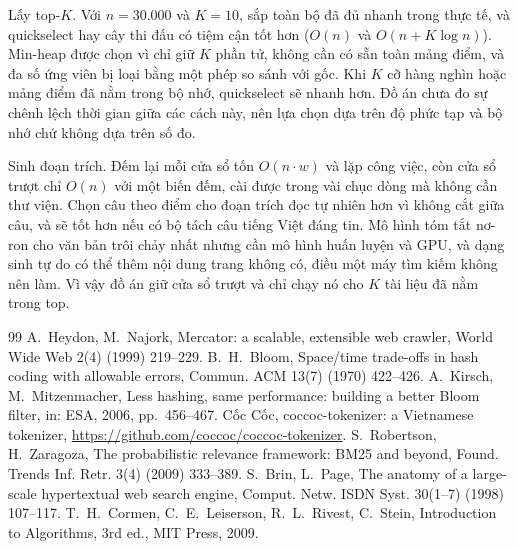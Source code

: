 \documentclass[9pt,twocolumn,a4paper]{extarticle}
\begin{document}
Lấy top-$K$. Với $n=30.000$ và $K=10$, sắp toàn bộ đã đủ nhanh trong thực tế, và quickselect hay cây thi đấu có tiệm cận tốt hơn ($O(n)$ và $O(n+K\log n)$). Min-heap được chọn vì chỉ giữ $K$ phần tử, không cần có sẵn toàn mảng điểm, và đa số ứng viên bị loại bằng một phép so sánh với gốc. Khi $K$ cỡ hàng nghìn hoặc mảng điểm đã nằm trong bộ nhớ, quickselect sẽ nhanh hơn. Đồ án chưa đo sự chênh lệch thời gian giữa các cách này, nên lựa chọn dựa trên độ phức tạp và bộ nhớ chứ không dựa trên số đo.

Sinh đoạn trích. Đếm lại mỗi cửa sổ tốn $O(n\cdot w)$ và lặp công việc, còn cửa sổ trượt chỉ $O(n)$ với một biến đếm, cài được trong vài chục dòng mà không cần thư viện. Chọn câu theo điểm cho đoạn trích đọc tự nhiên hơn vì không cắt giữa câu, và sẽ tốt hơn nếu có bộ tách câu tiếng Việt đáng tin. Mô hình tóm tắt nơ-ron cho văn bản trôi chảy nhất nhưng cần mô hình huấn luyện và GPU, và dạng sinh tự do có thể thêm nội dung trang không có, điều một máy tìm kiếm không nên làm. Vì vậy đồ án giữ cửa sổ trượt và chỉ chạy nó cho $K$ tài liệu đã nằm trong top.

\begin{thebibliography}{99}\footnotesize\itemsep0pt\parskip0pt
 A.~Heydon, M.~Najork, Mercator: a scalable, extensible web crawler, World Wide Web 2(4) (1999) 219--229.
 B.~H.~Bloom, Space/time trade-offs in hash coding with allowable errors, Commun. ACM 13(7) (1970) 422--426.
 A.~Kirsch, M.~Mitzenmacher, Less hashing, same performance: building a better Bloom filter, in: ESA, 2006, pp.~456--467.
 Cốc Cốc, coccoc-tokenizer: a Vietnamese tokenizer, \url{https://github.com/coccoc/coccoc-tokenizer}.
 S.~Robertson, H.~Zaragoza, The probabilistic relevance framework: BM25 and beyond, Found. Trends Inf. Retr. 3(4) (2009) 333--389.
 S.~Brin, L.~Page, The anatomy of a large-scale hypertextual web search engine, Comput. Netw. ISDN Syst. 30(1--7) (1998) 107--117.
 T.~H.~Cormen, C.~E.~Leiserson, R.~L.~Rivest, C.~Stein, Introduction to Algorithms, 3rd ed., MIT Press, 2009.
\end{thebibliography}
\end{document}
